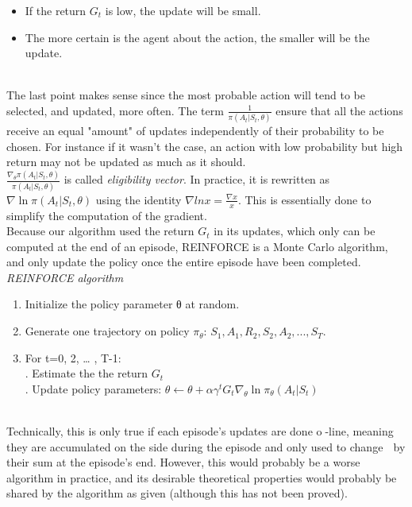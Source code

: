 \documentclass[11pt, onecolumn, a4paper]{report}
\begin{document}
\begin{itemize}
    \item If the return $G_t$ is low, the update will be small.
    \item The more certain is the agent about the action, the smaller will be the update.\\
\end{itemize} \\

The last point makes sense since the most probable action will tend to be selected, and updated, more often. The term $\frac{1}{\pi(A_t |S_t,\theta)}$ ensure that all the actions receive an equal "amount" of updates independently of their probability to be chosen. For instance if it wasn't the case, an action with low probability but high return may not be updated as much as it should.\\

$\frac{\nabla_\theta \pi(A_t|S_t,\theta)}{\pi(A_t |S_t,\theta)}$ is called \textit{eligibility vector}. In practice, it is rewritten as $\nabla \ln{\pi(A_t |S_t,\theta)}$ using the identity $\nabla ln x =  \frac{\nabla x}{x}$. This is essentially done to simplify the computation of the gradient.\\

Because our algorithm used the return $G_t$ in its updates, which only can be computed at the end of an episode, REINFORCE is a Monte Carlo algorithm, and only update the policy once the entire episode have been completed.\\

\textit{\large {REINFORCE algorithm}}
  \begin{enumerate}
  \item Initialize the policy parameter θ at random.
  \item Generate one trajectory on policy $\pi_\theta$: $S_1, A_1, R_2, S_2, A_2,...,S_T.$
  \item For t=0, 2, … , T-1:\\
  . Estimate the the return  $G_t$\\
  . Update policy parameters: $\theta \leftarrow \theta + \alpha \gamma^t G_t \nabla_\theta \ln \pi_\theta(A_t \vert S_t)$
  \end{enumerate}
 
\\
Technically, this is only true if each episode's updates are done o-line, meaning they are accumulated on the side
during the episode and only used to change  by their sum at the episode's end. However, this would probably be a
worse algorithm in practice, and its desirable theoretical properties would probably be shared by the algorithm as given
(although this has not been proved).
\\
\end{document}

